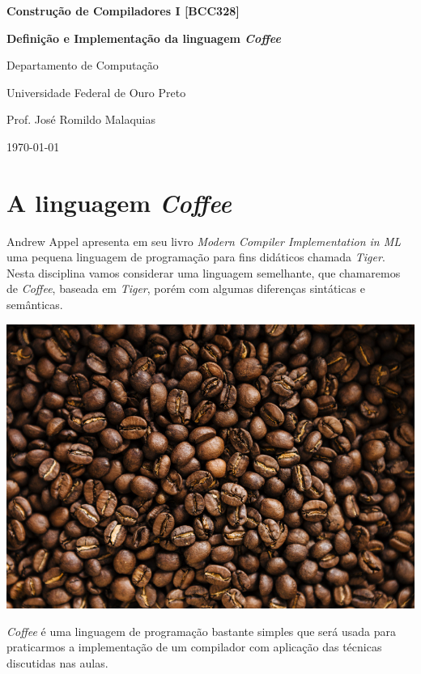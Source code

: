 \documentclass[a4paper,11pt,brazil]{article}
\newcommand{\tiger}{\textsl{Tiger}}
\newcommand{\lang}{\textsl{Coffee}}
\begin{document}
\begin{center}
  \textbf{Construção de Compiladores I [BCC328]}
\end{center}
\begin{tcolorbox}[colback=yellow!20]
  \begin{center}
    \textbf{\Large Definição e Implementação da linguagem \lang{}}\\[1em]
  \end{center}
\end{tcolorbox}
\begin{center}
  Departamento de Computação\par
  Universidade Federal de Ouro Preto\par
  Prof. José Romildo Malaquias\par
  \today
\end{center}

\begin{abstract}
  \lang{} é uma pequena linguagem de programação usada para fins
  didáticos na aprendizagem de técnicas de construção de
  compiladores.
  
  A documentação e implementação de \lang{} será realizada de forma
  colaborativa pelos participantes do curso.
\end{abstract}

\tableofcontents

\section{A linguagem \lang{}}

Andrew Appel apresenta em seu livro \textsl{Modern Compiler
  Implementation in ML} uma pequena linguagem de programação para fins
didáticos chamada \tiger{}. Nesta disciplina vamos considerar uma
linguagem semelhante, que chamaremos de \lang{}, baseada em \tiger{},
porém com algumas diferenças sintáticas e semânticas.
\begin{center}
  \includegraphics[width=.4\textwidth]{coffee.jpeg}
\end{center}

\lang{} é uma linguagem de programação bastante simples que será usada
para praticarmos a implementação de um compilador com aplicação das
técnicas discutidas nas aulas.
\end{document}
